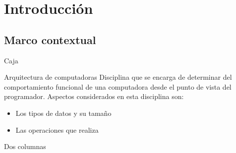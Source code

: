 \section{Introducción}

\subsection{Marco contextual}

\begin{frame}{Caja}
   \begin{Block}{Arquitectura de computadoras}
      Disciplina que se encarga de determinar del comportamiento funcional de una computadora desde el punto de vista del programador. Aspectos considerados en esta disciplina son:
   \begin{itemize}
      \item Los tipos de datos y su tamaño
      \item Las operaciones que realiza
   \end{itemize}
   \end{Block}
\end{frame}

\begin{frame}{Dos columnas}
  \begin{twocols}
  \end{twocols}
\end{frame}


